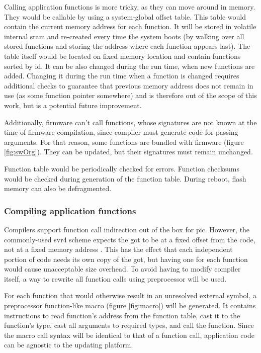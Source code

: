 Calling application functions is more tricky, as they can move around in memory. They would be callable by using a system-global offset table. This table would contain the current memory address for each function. It will be stored in volatile internal \gls{sram} and re-created every time the system boots (by walking over all stored functions and storing the address where each function appears last). The table itself would be located on fixed memory location and contain functions sorted by id. It can be also changed during the run time, when new functions are added. Changing it during the run time when a function is changed requires additional checks to guarantee that previous memory address does not remain in use (as some function pointer somewhere) and is therefore out of the scope of this work, but is a potential future improvement.

Additionally, firmware can't call functions, whose signatures are not known at the time of firmware compilation, since compiler must generate code for passing arguments. For that reason, some functions  are bundled with firmware (figure \ref{fig:swOrg}). They can be updated, but their signatures must remain unchanged.

Function table would be periodically checked for errors. Function checksums would be checked during generation of the function table. During reboot, flash memory can also be defragmented.

\subsubsection{Compiling application functions}

Compilers support function call indirection out of the box for \gls{pic}. However, the commonly-used \gls{svr4} scheme expects the \gls{got} to be at a fixed offset from the code, not at a fixed memory address \cite[Chapter~8]{Levine1999}. This has the effect that each independent portion of code needs its own copy of the \gls{got}, but having one for each function would cause unacceptable size overhead. To avoid having to modify compiler itself, a way to rewrite all function calls using preprocessor will be used.

For each function that would otherwise result in an unresolved external symbol, a preprocessor function-like macro (figure \ref{fig:macro}) will be generated. It contains instructions to read function's address from the function table, cast it to the function's type, cast all arguments to required types, and call the function. Since the macro call syntax will be identical to that of a function call, application code can be agnostic to the updating platform.

